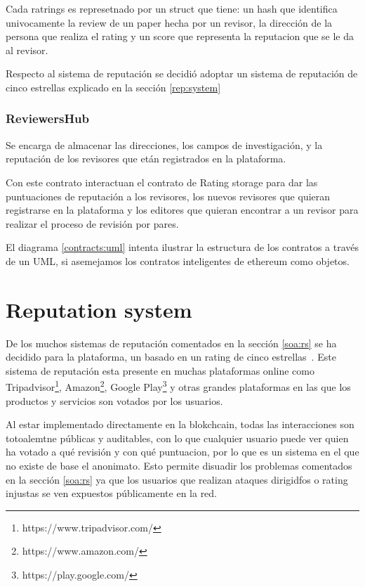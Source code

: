 Cada ratrings es represetnado por un struct que tiene: un hash que identifica
univocamente la review de un paper hecha por un revisor, la dirección de la
persona que realiza el rating y un score que representa la reputacion que se le
da al revisor.

Respecto al sistema de reputación se decidió adoptar un sistema de reputación de
cinco estrellas explicado en la sección \ref{rep:system}

\subsubsection*{ReviewersHub}

Se encarga de almacenar las direcciones, los campos de investigación, y la
reputación de los revisores que etán registrados en la plataforma.

Con este contrato interactuan el contrato de Rating storage para dar las
puntuaciones de reputación a los revisores, los nuevos revisores que quieran
registrarse en la plataforma y los editores que quieran encontrar a un revisor
para realizar el proceso de revisión por pares.


El diagrama \ref{contracts:uml} intenta ilustrar la estructura de los contratos
a través de un UML, si asemejamos los contratos inteligentes de ethereum como
objetos.


\section{Reputation system}

De los muchos sistemas de reputación comentados en la sección \ref{soa:rs} se ha
decidido para la plataforma, un basado en un rating de cinco
estrellas~\cite{kinateder2003architecture}. Este sistema de reputación esta
presente en muchas plataformas online como
Tripadvisor\footnote{https://www.tripadvisor.com/},
Amazon\footnote{https://www.amazon.com/}, Google
Play\footnote{https://play.google.com/} y otras grandes plataformas en las que
los productos y servicios son votados por los usuarios.

Al estar implementado directamente en la blokchcain, todas las interacciones son
totoalemtne públicas y auditables, con lo que cualquier usuario puede ver quien
ha votado a qué revisión y con qué puntuacion, por lo que es un sistema en el
que no existe de base el anonimato. Esto permite disuadir los problemas
comentados en la sección \ref{soa:rs} ya que los usuarios que realizan ataques
dirigidfos o rating injustas se ven expuestos públicamente en la red.

